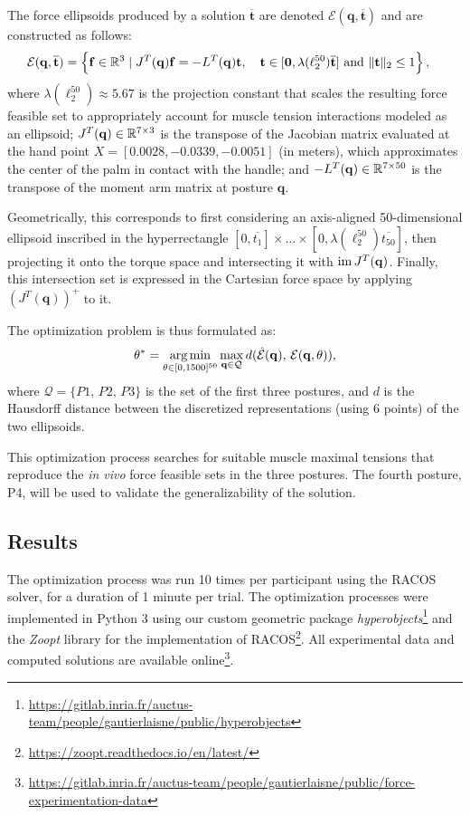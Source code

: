 The force ellipsoids produced by a solution $\overline{\mathbf{t}}$ are denoted $\mathcal{E}(\mathbf{q}, \overline{\mathbf{t}})$ and are constructed as follows:
\begin{align*}
    \mathcal{E}(\mathbf{q}, \overline{\mathbf{t}}) &= \left\{ \mathbf{f} \in \mathbb{R}^3 \mid J^T(\mathbf{q})\mathbf{f} = -L^T(\mathbf{q})\mathbf{t}, \quad \mathbf{t}\in [\mathbf{0}, \lambda(\ell_2^{50})\overline{\mathbf{t}}] \text{ and } \|\mathbf{t}\|_2 \leq 1\right\},
\end{align*}
where $\lambda(\ell_2^{50}) \approx 5.67$ is the projection constant that scales the resulting force feasible set to appropriately account for muscle tension interactions modeled as an ellipsoid; $J^T(\mathbf{q})\in\mathbb{R}^{7\times 3}$ is the transpose of the Jacobian matrix evaluated at the hand point $X = [0.0028, -0.0339, -0.0051]$ (in meters), which approximates the center of the palm in contact with the handle; and $-L^T(\mathbf{q})\in\mathbb{R}^{7\times 50}$ is the transpose of the moment arm matrix at posture $\mathbf{q}$.

Geometrically, this corresponds to first considering an axis-aligned 50-dimensional ellipsoid inscribed in the hyperrectangle $[0, \overline{t_1}]\times \dots \times [0,\lambda(\ell_2^{50})\overline{t_{50}}]$, then projecting it onto the torque space and intersecting it with $\operatorname{im}{J^T(\mathbf{q})}$. Finally, this intersection set is expressed in the Cartesian force space by applying $(J^T(\mathbf{q}))^+$ to it.

The optimization problem is thus formulated as:
\begin{align*}
    \theta^* = \operatorname*{arg\,min}_{\theta \in [0, 1500]^{50}} \max_{\mathbf{q}\in\mathcal{Q}} d(\hat{\mathcal{E}}(\mathbf{q}),\, \mathcal{E}(\mathbf{q}, \theta)),
\end{align*}
where $\mathcal{Q} = \{P1, \, P2,\, P3\}$ is the set of the first three postures, and $d$ is the Hausdorff distance between the discretized representations (using 6 points) of the two ellipsoids.

This optimization process searches for suitable muscle maximal tensions that reproduce the \emph{in vivo} force feasible sets in the three postures. The fourth posture, P4, will be used to validate the generalizability of the solution.

\subsection{Results}
\label{subsec:results_chapt5}
The optimization process was run 10 times per participant using the RACOS solver, for a duration of 1 minute per trial. The optimization processes were implemented in Python 3 using our custom geometric package \emph{hyperobjects}\footnote{\url{https://gitlab.inria.fr/auctus-team/people/gautierlaisne/public/hyperobjects}} and the \emph{Zoopt} library for the implementation of RACOS\footnote{\url{https://zoopt.readthedocs.io/en/latest/}}. All experimental data and computed solutions are available online\footnote{\url{https://gitlab.inria.fr/auctus-team/people/gautierlaisne/public/force-experimentation-data}}.

